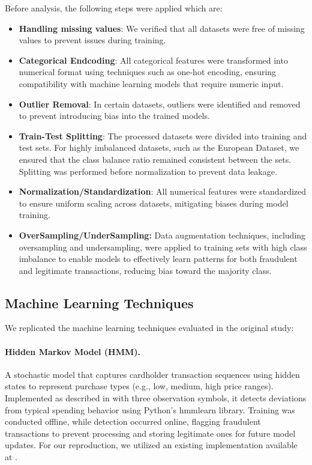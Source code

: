 \documentclass{article}
\begin{document}
Before analysis, the following steps were applied which are:
\begin{itemize}
    \item \textbf{Handling missing values}: We verified that all datasets were free of missing values to prevent issues during training.

    \item \textbf{Categorical Endcoding}: All categorical features were transformed into numerical format using techniques such as one-hot encoding, ensuring compatibility with machine learning models that require numeric input.

    \item \textbf{Outlier Removal}: In certain datasets, outliers were identified and removed to prevent introducing bias into the trained models.

    \item \textbf{Train-Test Splitting}: The processed datasets were divided into training and test sets. For highly imbalanced datasets, such as the European Dataset, we ensured that the class balance ratio remained consistent between the sets. Splitting was performed before normalization to prevent data leakage.

    \item \textbf{Normalization/Standardization}: All numerical features were standardized to ensure uniform scaling across datasets, mitigating biases during model training.

    \item \textbf{OverSampling/UnderSampling:} Data augmentation techniques, including oversampling and undersampling, were applied to training sets with high class imbalance to enable models to effectively learn patterns for both fraudulent and legitimate transactions, reducing bias toward the majority class.
\end{itemize}

\subsection{Machine Learning Techniques}
We replicated the machine learning techniques evaluated in the original study:

\paragraph{Hidden Markov Model (HMM).}
A stochastic model that captures cardholder transaction sequences using hidden states to represent purchase types (e.g., low, medium, high price ranges). Implemented as described in \cite{srivastava2008credit} with three observation symbols, it detects deviations from typical spending behavior using Python’s hmmlearn library. Training was conducted offline, while detection occurred online, flagging fraudulent transactions to prevent processing and storing legitimate ones for future model updates. For our reproduction, we utilized an existing implementation available at \cite{khamesian_credit-card-fraud-detection}.
\end{document}
